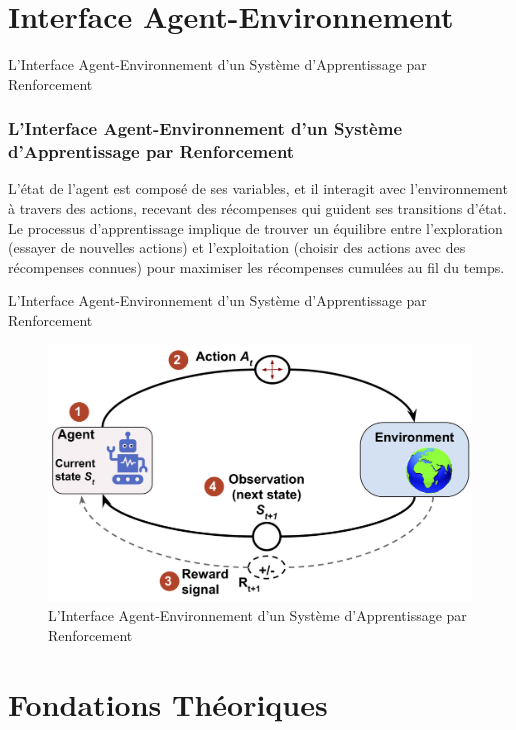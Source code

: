 \documentclass[serif, aspectratio=169]{beamer}
\begin{document}
\section{Interface Agent-Environnement}

\begin{frame}{L'Interface Agent-Environnement d'un Système d'Apprentissage par Renforcement}
	\frametitle<presentation>{L'Interface Agent-Environnement d'un Système d'Apprentissage par Renforcement}
	
	L'état de l'agent est composé de ses variables, et il interagit avec l'environnement à travers des actions, recevant des récompenses qui guident ses transitions d'état. Le processus d'apprentissage implique de trouver un équilibre entre l'exploration (essayer de nouvelles actions) et l'exploitation (choisir des actions avec des récompenses connues) pour maximiser les récompenses cumulées au fil du temps. 
	
\end{frame}

\begin{frame}{L'Interface Agent-Environnement d'un Système d'Apprentissage par Renforcement}
	
	\begin{figure}[htpb]
		\centering
		\includegraphics[keepaspectratio, scale=0.6]{images/interface-agent-environnement.png}
		\caption{L'Interface Agent-Environnement d'un Système d'Apprentissage par Renforcement}
		\label{fig:agent-environment}
	\end{figure}
	
\end{frame}


\section{Fondations Théoriques}
\end{document}
